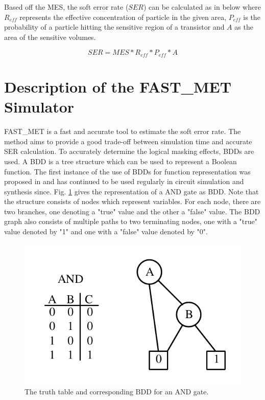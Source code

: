 Based off the MES, the soft error rate ($SER$) can be calculated as in below where $R_{eff}$ represents the effective concentration of particle in the given area, $P_{eff}$ is the probability of a particle hitting the sensitive region of a transistor and $A$ as the area of the sensitive volumes.

\begin{equation} \label{SER}
SER = MES*R_{eff}*P_{eff}*A 
\end{equation}

\section{Description of the FAST\_MET Simulator} \label{ch3:desc}

FAST\_MET is a fast and accurate tool to estimate the soft error rate. The method aims to provide a good trade-off between simulation time and accurate SER calculation. To accurately determine the logical masking effects, BDDs are used. A BDD is a tree structure which can be used to represent a Boolean function. The first instance of the use of BDDs for function representation was proposed in \cite{Bryant1986} and has continued to be used regularly in circuit simulation and synthesis since. Fig. \ref{BDD_AND} gives the representation of a AND gate as BDD. Note that the structure consists of nodes which represent variables. For each node, there are two branches, one denoting a "true" value and the other a "false" value. The BDD graph also consists of multiple paths to two terminating nodes, one with a "true" value denoted by "1" and one with a "false" value denoted by "0".

\begin{figure}[!htbp]
	\centering
	\includegraphics[width=0.55\linewidth]{Figures/BDDFunc}
	\caption{The truth table and corresponding BDD for an AND gate.}
	\label{BDD_AND}
\end{figure}


